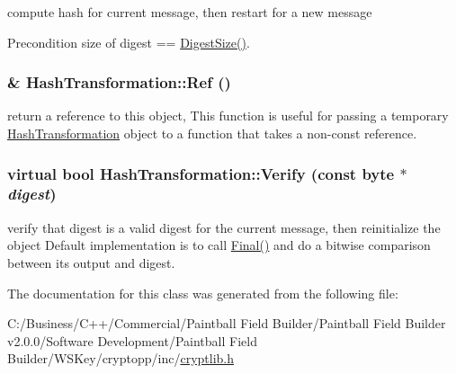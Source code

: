 compute hash for current message, then restart for a new message \begin{DoxyPrecond}{Precondition}
size of digest == \hyperlink{class_hash_transformation_a9f42cc280bac76b884ad12615c0dabb5}{DigestSize()}. 
\end{DoxyPrecond}
\hypertarget{class_hash_transformation_a39b0a4c4cdc11fda358f9975b5e4137e}{
\subsubsection[{Ref}]{\& HashTransformation::Ref ()}}
\label{class_hash_transformation_a39b0a4c4cdc11fda358f9975b5e4137e}


return a reference to this object, This function is useful for passing a temporary \hyperlink{class_hash_transformation}{HashTransformation} object to a function that takes a non-\/const reference. \hypertarget{class_hash_transformation_a16c4aecd047015d513feef4ed5b929ba}{
\subsubsection[{Verify}]{\setlength{\rightskip}{0pt plus 5cm}virtual bool HashTransformation::Verify (const byte $\ast$ {\em digest})}}
\label{class_hash_transformation_a16c4aecd047015d513feef4ed5b929ba}


verify that digest is a valid digest for the current message, then reinitialize the object Default implementation is to call \hyperlink{class_hash_transformation_aa0b8c7a110d8968268fd02ec32b9a8e8}{Final()} and do a bitwise comparison between its output and digest. 

The documentation for this class was generated from the following file:\begin{DoxyCompactItemize}
\item 
C:/Business/C++/Commercial/Paintball Field Builder/Paintball Field Builder v2.0.0/Software Development/Paintball Field Builder/WSKey/cryptopp/inc/\hyperlink{cryptlib_8h}{cryptlib.h}\end{DoxyCompactItemize}
